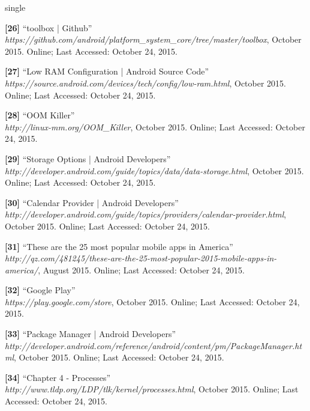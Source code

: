 \documentclass[12pt]{uthesis-v12}  %
\begin{document}
\begin{referencelist}{single}
	\item \textbf{[26]} ``toolbox | Github''
	\\\emph{https://github.com/android/platform\_system\_core/tree/master/toolbox}, October 2015. 
	Online; Last Accessed: October 24, 2015.	
					
	\item \textbf{[27]} ``Low RAM Configuration | Android Source Code''
	\\\emph{https://source.android.com/devices/tech/config/low-ram.html}, October 2015. 
	Online; Last Accessed: October 24, 2015.
						
	\item \textbf{[28]} ``OOM Killer''
	\\\emph{http://linux-mm.org/OOM\_Killer}, October 2015. 
	Online; Last Accessed: October 24, 2015.
	
	\item \textbf{[29]} ``Storage Options | Android Developers''
	\\\emph{http://developer.android.com/guide/topics/data/data-storage.html}, October 2015. 
	Online; Last Accessed: October 24, 2015.

	\item \textbf{[30]} ``Calendar Provider | Android Developers''
	\\\emph{http://developer.android.com/guide/topics/providers/calendar-provider.html}, October 2015. 
	Online; Last Accessed: October 24, 2015.

	\item \textbf{[31]} ``These are the 25 most popular mobile apps in America''
	\\\emph{http://qz.com/481245/these-are-the-25-most-popular-2015-mobile-apps-in-america/}, August 2015. 
	Online; Last Accessed: October 24, 2015.
	
	\item \textbf{[32]} ``Google Play''
	\\\emph{https://play.google.com/store}, October 2015. 
	Online; Last Accessed: October 24, 2015.
											
	\item \textbf{[33]} ``Package Manager | Android Developers''
	\\\emph{http://developer.android.com/reference/android/content/pm/PackageManager.html}, October 2015. 
	Online; Last Accessed: October 24, 2015.

	\item \textbf{[34]} ``Chapter 4 - Processes''
	\\\emph{http://www.tldp.org/LDP/tlk/kernel/processes.html}, October 2015. 
	Online; Last Accessed: October 24, 2015.
	

\end{referencelist}
\end{document}
